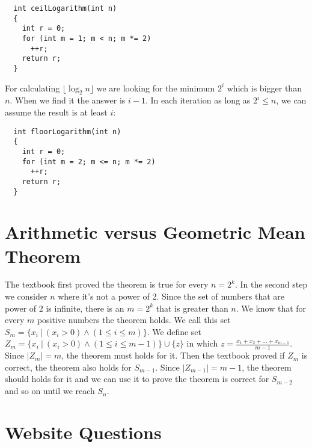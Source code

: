 \documentclass{book}
\begin{document}
	\begin{lstlisting}
  int ceilLogarithm(int n)
  {
    int r = 0;    
    for (int m = 1; m < n; m *= 2)
      ++r;
    return r;
  }
	\end{lstlisting}
	For calculating $\lfloor \log_2{n} \rfloor$ we are looking for the minimum $2^i$ which is bigger than $n$. When we find it the answer is $i - 1$. In each iteration as long as $2^i \le n$, we can assume the result is at least $i$:
	
	\begin{lstlisting}
  int floorLogarithm(int n)
  {
    int r = 0;    
    for (int m = 2; m <= n; m *= 2)
      ++r;
    return r;
  }
	\end{lstlisting}
	\section{Arithmetic versus Geometric Mean Theorem}
	The textbook first proved the theorem is true for every $n = 2^k$. In the second step we consider $n$ where it's not a power of 2. Since the set of numbers that are power of 2 is infinite, there is an $m = 2^k$ that is greater than $n$. We know that for every $m$ positive numbers the theorem holds. We call this set $S_m = \{x_i\ |\ (x_i > 0) \land (1 \le i \le m)\}$. We define set $Z_m = \{x_i\ |\ (x_i > 0) \land (1 \le i \le m - 1)\} \cup \{z\}$ in which $z = \frac{x_1 + x_2 + \dots + x_{m - 1}}{m - 1}$. Since $|Z_m| = m$, the theorem must holds for it. Then the textbook proved if $Z_m$ is correct, the theorem also holds for $S_{m - 1}$. Since $|Z_{m - 1}| = m - 1$, the theorem should holds for it and we can use it to prove the theorem is correct for $S_{m - 2}$ and so on until we reach $S_n$.
	\section{Website Questions}
\end{document}
